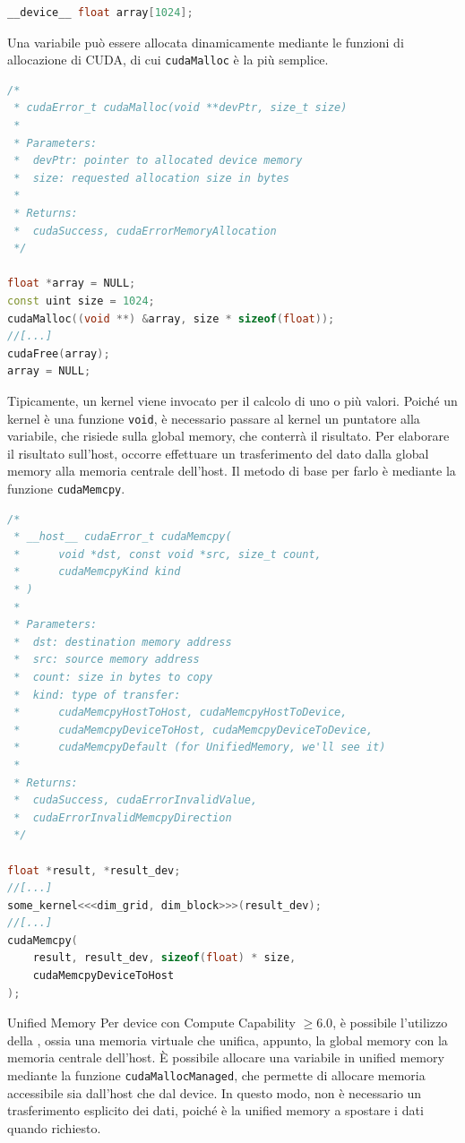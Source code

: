 \begin{lstlisting}[language=C++, numbers=none]
__device__ float array[1024];
\end{lstlisting}

Una variabile può essere allocata dinamicamente mediante le funzioni di allocazione di CUDA, di cui \texttt{cudaMalloc} è la più semplice.

\begin{lstlisting}[language=C++, numbers=none]
/*
 * cudaError_t cudaMalloc(void **devPtr, size_t size)	
 * 
 * Parameters:
 *  devPtr: pointer to allocated device memory
 *  size: requested allocation size in bytes
 *
 * Returns:
 *  cudaSuccess, cudaErrorMemoryAllocation
 */

float *array = NULL; 
const uint size = 1024;
cudaMalloc((void **) &array, size * sizeof(float));
//[...]
cudaFree(array);
array = NULL;
\end{lstlisting}

Tipicamente, un kernel viene invocato per il calcolo di uno o più valori.
Poiché un kernel è una funzione \texttt{void}, è necessario passare al kernel un puntatore alla variabile, che risiede sulla global memory, che conterrà il risultato.
Per elaborare il risultato sull'host, occorre effettuare un trasferimento del dato dalla global memory alla memoria centrale dell'host.
Il metodo di base per farlo è mediante la funzione \texttt{cudaMemcpy}.

\begin{lstlisting}[language=C++, numbers=none]
/*
 * __host__ cudaError_t cudaMemcpy(
 *      void *dst, const void *src, size_t count,
 *      cudaMemcpyKind kind
 * )
 * 
 * Parameters:
 *  dst: destination memory address
 *  src: source memory address
 *  count: size in bytes to copy
 *  kind: type of transfer:
 *      cudaMemcpyHostToHost, cudaMemcpyHostToDevice,
 *      cudaMemcpyDeviceToHost, cudaMemcpyDeviceToDevice,
 *      cudaMemcpyDefault (for UnifiedMemory, we'll see it)
 *
 * Returns:
 *  cudaSuccess, cudaErrorInvalidValue,
 *  cudaErrorInvalidMemcpyDirection
 */

float *result, *result_dev;
//[...]
some_kernel<<<dim_grid, dim_block>>>(result_dev);
//[...]
cudaMemcpy(
    result, result_dev, sizeof(float) * size,
    cudaMemcpyDeviceToHost
);
\end{lstlisting}

\begin{observation}{Unified Memory}
Per device con Compute Capability \(\geq 6.0\), è possibile l'utilizzo della , ossia una memoria virtuale che unifica, appunto, la global memory con la memoria centrale dell'host.
È possibile allocare una variabile in unified memory mediante la funzione \texttt{cudaMallocManaged}, che permette di allocare memoria accessibile sia dall'host che dal device.
In questo modo, non è necessario un trasferimento esplicito dei dati, poiché è la unified memory a spostare i dati quando richiesto.
\end{observation}

